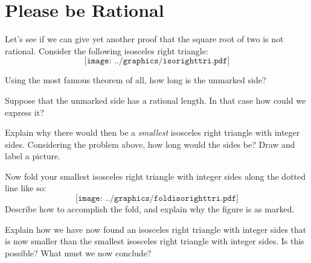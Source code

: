 \newpage
\section{Please be Rational}

Let's see if we can give yet another proof that the square root of two
is not rational. Consider the following isosceles right triangle:
\[
\texttt{[image: ../graphics/isorighttri.pdf]}
\]
\begin{prob}
Using the most famous theorem of all, how long is the unmarked side?
\end{prob}

\begin{prob} 
Suppose that the unmarked side has a rational length. In that case how
could we express it?
\end{prob}

\begin{prob}
Explain why there would then be a \textit{smallest} isosceles right
triangle with integer sides. Considering the problem above, how long
would the sides be? Draw and label a picture.
\end{prob}

\newpage
\begin{prob}
Now fold your smallest isosceles right triangle with integer sides
along the dotted line like so:
\[
\texttt{[image: ../graphics/foldisorighttri.pdf]}
\]
Describe how to accomplish the fold, and explain why the figure is as marked.  
\end{prob}
\vspace{1in}

\begin{prob}
Explain how we have now found an isosceles right triangle with integer
sides that is now smaller than the smallest isosceles right triangle
with integer sides. Is this possible? What must we now conclude?
\end{prob}
